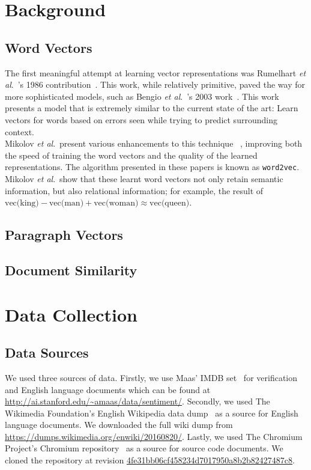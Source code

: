 \documentclass[11pt]{article}
\def\etal{\emph{et al}.\ }
\begin{document}
\section*{Background}

\subsection*{Word Vectors}
The first meaningful attempt at learning vector representations was
Rumelhart \etal's 1986 contribution~\cite{rumelhart1988learning}. This work,
while relatively primitive, paved the way for more sophisticated models, such
as Bengio \etal's 2003 work~\cite{bengio2003neural}. This work presents a model
that is extremely similar to the current state of the art: Learn vectors for
words based on errors seen while trying to predict surrounding context.\\
Mikolov \etal present various enhancements to this technique
~\cite{mikolov2013distributed, mikolov2013efficient}, improving both the speed
of training the word vectors and the quality of the learned representations.
The algorithm presented in these papers is known as \texttt{word2vec}.
Mikolov \etal show that these learnt word vectors not only retain semantic
information, but also relational information; for example, the result of
$\text{vec(king)} - \text{vec(man)} + \text{vec(woman)} \approx
\text{vec(queen)}$.

\subsection*{Paragraph Vectors}


\subsection*{Document Similarity}


\section*{Data Collection}

\subsection*{Data Sources}
We used three sources of data. Firstly, we use Maas' IMDB set~\cite{maas2011}
for verification and English language documents which can be found at
\url{http://ai.stanford.edu/~amaas/data/sentiment/}. Secondly, we used The
Wikimedia Foundation's English Wikipedia data dump~\cite{wikidatadump2016} as
a source for English language documents. We downloaded the full wiki dump from
\url{https://dumps.wikimedia.org/enwiki/20160820/}. Lastly, we used The
Chromium Project's Chromium repository~\cite{chromium2016} as a source for
source code documents. We cloned the repository at revision
\href{https://github.com/nwjs/chromium.src/commit/4fe31bb06cf458234d7017950a8b2b82427487c8}
{4fe31bb06cf458234d7017950a8b2b82427487c8}.
\end{document}
